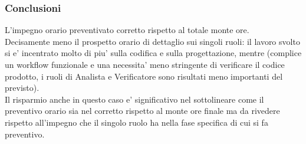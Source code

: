 \subsubsection{Conclusioni}
L'impegno orario preventivato corretto rispetto al totale monte ore.\\ Decisamente meno il prospetto orario di dettaglio sui singoli ruoli: il lavoro svolto si e' incentrato molto di piu' sulla codifica e sulla progettazione, mentre (complice un workflow funzionale e una necessita' meno stringente di verificare il codice prodotto, i ruoli di Analista e Verificatore sono risultati meno importanti del previsto).\\
Il risparmio anche in questo caso e' significativo nel sottolineare come il preventivo orario sia nel corretto rispetto al monte ore finale ma da rivedere rispetto all'impegno che il singolo ruolo ha nella fase specifica di cui si fa preventivo. \\ 

